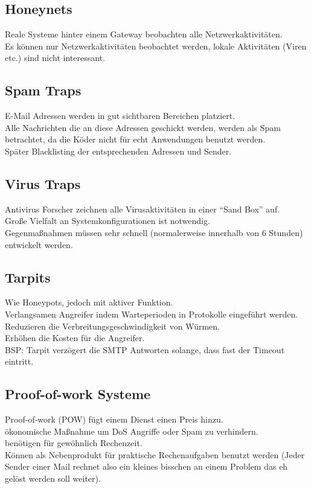 \documentclass{article} %
\begin{document}
\subsection{Honeynets}
Reale Systeme hinter einem Gateway beobachten alle Netzwerkaktivitäten.\\
Es können nur Netzwerkaktivitäten beobachtet werden, lokale Aktivitäten (Viren etc.) sind nicht interessant.\\
\subsection{Spam Traps}
E-Mail Adressen werden in gut sichtbaren Bereichen platziert.\\
Alle Nachrichten die an diese Adressen geschickt werden, werden als Spam betrachtet, da die Köder nicht für echt Anwendungen benutzt werden.\\
Später Blacklisting der entsprechenden Adressen und Sender.
\subsection{Virus Traps}
Antivirus Forscher zeichnen alle Virusaktivitäten in einer "`Sand Box"' auf.\\
Große Vielfalt an Systemkonfigurationen ist notwendig.\\
Gegenmaßnahmen müssen sehr schnell (normalerweise innerhalb von 6 Stunden) entwickelt werden.
\subsection{Tarpits}
Wie Honeypots, jedoch mit aktiver Funktion.\\
Verlangsamen Angreifer indem Warteperioden in Protokolle eingeführt werden.\\
Reduzieren die Verbreitungsgeschwindigkeit von Würmen.\\
Erhöhen die Kosten für die Angreifer.\\
BSP: Tarpit verzögert die SMTP Antworten solange, dass fast der Timeout eintritt.
\subsection{Proof-of-work Systeme}
Proof-of-work (POW) fügt einem Dienst einen Preis hinzu.\\
ökonomische Maßnahme um DoS Angriffe oder Spam zu verhindern.\\
benötigen für gewöhnlich Rechenzeit.\\
Können als Nebenprodukt für praktische Rechenaufgaben benutzt werden (Jeder Sender einer Mail rechnet also ein kleines bisschen an einem Problem das eh gelöst werden soll weiter). 
\end{document}
